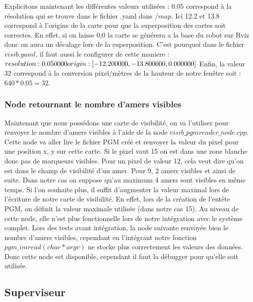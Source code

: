 \documentclass[10pt,a4paper]{article}
\begin{document}
Explicitons maintenant les différentes valeurs utilisées : 0.05 correspond à la résolution qui se trouve dans le fichier .yaml dans $/map$. Ici 12.2 et 13.8 correspond à l'origine de la carte pour que la superposition des cartes soit correctes. En effet, si on laisse 0;0 la carte se générera a la base du robot sur Rviz donc on aura un décalage lors de la superposition. C'est pourquoi dans le fichier $visib.yaml$, il faut aussi le configurer de cette maniere :\\
$resolution: 0.050000\\
origin: [-12.200000, -13.800000, 0.000000]\\
$
Enfin, la valeur 32 correspond à la conversion pixel/mètres de la hauteur de notre fenêtre soit :\\ $640*0.05=32$.

\subsubsection{Node retournant le nombre d'amers visibles}
Maintenant que nous possédons une carte de visibilité, on va l'utiliser pour renvoyer le nombre d'amers visibles à l'aide de la node $visib\_pgmreader\_node.cpp$. Cette node va aller lire le fichier PGM créé et renvoyer la valeur du pixel pour une position x, y sur cette carte. Si le pixel vaut 15 on est dans une zone blanche donc pas de marqueurs visibles. Pour un pixel de valeur 12, cela veut dire qu'on est dans le champ de visibilité d'un amer. Pour 9, 2 amers visibles et ainsi de suite. Dans notre cas on suppose qu'au maximum 4 amers sont visibles en même temps. Si l'on souhaite plus, il suffit d'augmenter la valeur maximal lors de l’écriture  de notre carte de visibilité. En effet, lors de la création de l’entête PGM, on définit la valeur maximale utilisée (dans notre cas 15).
Au niveau de cette node, elle n'est plus fonctionnelle lors de notre intégration avec le système complet. Lors des tests avant intégration, la node suivante renvoyée bien le nombre d'amers visibles, cependant en l’intégrant notre fonction $pgm\_imread(char *argv)$ ne stocke plus correctement les valeurs des données. Donc cette node est disponible, cependant il faut la débugger pour qu'elle soit utilisée.

\subsection{Superviseur}
\label{sec:Superviseur}
\end{document}
